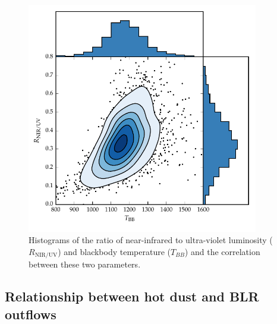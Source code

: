\begin{figure}[t!]
  \centering
  \includegraphics[width=0.9\textwidth]{figures/chapter05/ratio_tbb_density.pdf}
  \caption[{Ratio of near-infrared to ultra-violet luminosity ($R_{\text{NIR/UV}}$) against temperature ($T_{BB}$) for low-$z$ sample.}]{Histograms of the ratio of near-infrared to ultra-violet luminosity ($R_{\text{NIR/UV}}$) and blackbody temperature ($T_{BB}$) and the correlation between these two parameters. }
  \label{fig:ratio_tbb_density}
\end{figure}

\subsection{Relationship between hot dust and BLR outflows}

